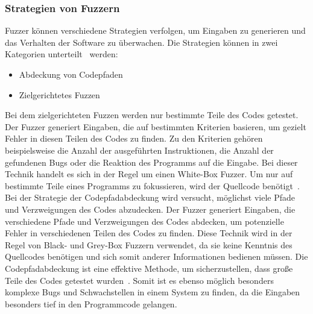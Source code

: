 \subsubsection{Strategien von Fuzzern}\label{subsubsec:strategien-von-fuzzern}
Fuzzer können verschiedene Strategien verfolgen, um Eingaben zu generieren und das Verhalten der Software zu überwachen.
Die Strategien können in zwei Kategorien unterteilt~\cite{iot-fuzzing} werden:
\begin{itemize}
    \item Abdeckung von Codepfaden
    \item Zielgerichtetes Fuzzen
\end{itemize}
Bei dem zielgerichteten Fuzzen werden nur bestimmte Teile des Codes getestet.
Der Fuzzer generiert Eingaben, die auf bestimmten Kriterien basieren, um gezielt Fehler in diesen Teilen des Codes zu finden.
Zu den Kriterien gehören beispielsweise die Anzahl der ausgeführten Instruktionen, die Anzahl der gefundenen Bugs oder
die Reaktion des Programms auf die Eingabe.
Bei dieser Technik handelt es sich in der Regel um einen White-Box Fuzzer.
Um nur auf bestimmte Teile eines Programms zu fokussieren, wird der Quellcode benötigt~\cite{directed-greybox-fuzzing}.\newline\newline
Bei der Strategie der Codepfadabdeckung wird versucht, möglichst viele Pfade und Verzweigungen des Codes abzudecken.
Der Fuzzer generiert Eingaben, die verschiedene Pfade und Verzweigungen des Codes abdecken, um potenzielle Fehler in verschiedenen
Teilen des Codes zu finden.
Diese Technik wird in der Regel von Black- und Grey-Box Fuzzern verwendet, da sie keine Kenntnis des Quellcodes benötigen und sich
somit anderer Informationen bedienen müssen.
Die Codepfadabdeckung ist eine effektive Methode, um sicherzustellen, dass große Teile des Codes getestet wurden~\cite{iot-fuzzing}.
Somit ist es ebenso möglich besonders komplexe Bugs und Schwachstellen in einem System zu finden, da die Eingaben besonders
tief in den Programmcode gelangen.